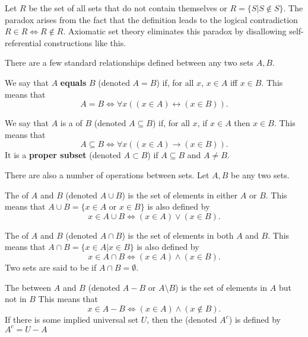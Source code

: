 \begin{example}
Let $R$ be the set of all sets that do not contain themselves or $R = \{S|S\notin S\}$.
The paradox arises from the fact that the definition leads to the logical contradiction $R\in R \Leftrightarrow R\notin R$.
Axiomatic set theory eliminates this paradox by disallowing self-referential constructions like this.
\end{example}

There are a few standard relationships defined between any two sets $A,B$.
\begin{definition}
We say that $A$ \textbf{equals} $B$ (denoted $A=B$) if, for all $x$,  $x\in A$ iff $x\in B$.
This means that
\[ A=B \Leftrightarrow \forall x \left( (x\in A)\leftrightarrow (x\in B) \right). \]
\end{definition}

\begin{definition}
We say that $A$ is a  of $B$ (denoted $A\subseteq B$) if, for all $x$, if $x\in A$ then $x\in B$.
This means that
\[ A\subseteq B  \Leftrightarrow \forall x \left( (x\in A)\rightarrow (x\in B) \right). \]
It is a \textbf{proper subset} (denoted $A\subset B$) if $A\subseteq B$ and $A\neq B$.
\end{definition}

There are also a number of operations between sets.
Let $A,B$ be any two sets.
\begin{definition}
The  of $A$ and $B$ (denoted $A\cup B$) is the set of elements in either $A$ or $B$.
This means that $A \cup B = \{ x\in A \textrm{ or } x\in B \}$ is also defined by
\[ x\in A\cup B \Leftrightarrow (x\in A)\vee (x\in B). \]
\end{definition}

\begin{definition}
The  of $A$ and $B$ (denoted $A\cap B$) is the set of elements in both $A$ and $B$.
This means that $A\cap B = \{x\in A | x\in B \}$ is also defined by
\[ x\in A\cap B \Leftrightarrow (x\in A)\wedge (x\in B). \]
Two sets are said to be  if $A\cap B = \emptyset$.
\end{definition}

\begin{definition}
The  between $A$ and $B$ (denoted $A-B$ or $A \setminus \!B$) is the set of elements in $A$ but not in $B$
This means that
\[ x\in A-B \Leftrightarrow (x\in A)\wedge (x\notin B). \]
If there is some implied universal set $U$, then the  (denoted $A^c$) is defined by $A^c = U-A$
\end{definition}

